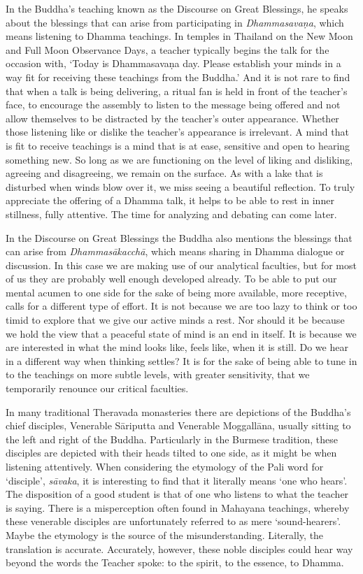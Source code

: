In the Buddha’s teaching known as the Discourse on Great
Blessings,\cite{mahamangala-sutta}
he speaks about the blessings that can arise from participating in
\emph{Dhammasavaṇa}, which means listening to Dhamma teachings. In temples in
Thailand on the New Moon and Full Moon Observance Days, a teacher
typically begins the talk for the occasion with, ‘Today is Dhammasavaṇa
day. Please establish your minds in a way fit for receiving these
teachings from the Buddha.’ And it is not rare to find that when a talk
is being delivering, a ritual fan is held in front of the teacher’s
face, to encourage the assembly to listen to the message being offered
and not allow themselves to be distracted by the teacher’s outer
appearance. Whether those listening like or dislike the teacher’s
appearance is irrelevant. A mind that is fit to receive teachings is a
mind that is at ease, sensitive and open to hearing something new. So
long as we are functioning on the level of liking and disliking,
agreeing and disagreeing, we remain on the surface. As with a lake that
is disturbed when winds blow over it, we miss seeing a beautiful
reflection. To truly appreciate the offering of a Dhamma talk, it helps
to be able to rest in inner stillness, fully attentive. The time for
analyzing and debating can come later.

In the Discourse on Great Blessings the Buddha also mentions the
blessings that can arise from \emph{Dhammasākacchā}, which means sharing in
Dhamma dialogue or discussion. In this case we are making use of our
analytical faculties, but for most of us they are probably well enough
developed already. To be able to put our mental acumen to one side for
the sake of being more available, more receptive, calls for a different
type of effort. It is not because we are too lazy to think or too timid
to explore that we give our active minds a rest. Nor should it be
because we hold the view that a peaceful state of mind is an end in
itself. It is because we are interested in what the mind looks like,
feels like, when it is still. Do we hear in a different way when
thinking settles? It is for the sake of being able to tune in to the
teachings on more subtle levels, with greater sensitivity, that we
temporarily renounce our critical faculties.

In many traditional Theravada monasteries there are depictions of the
Buddha’s chief disciples, Venerable Sāriputta and Venerable Moggallāna,
usually sitting to the left and right of the Buddha. Particularly in the
Burmese tradition, these disciples are depicted with their heads tilted
to one side, as it might be when listening attentively. When considering
the etymology of the Pali word for ‘disciple’, \emph{sāvaka}, it is
interesting to find that it literally means ‘one who hears’. The
disposition of a good student is that of one who listens to what the
teacher is saying. There is a misperception often found in Mahayana
teachings, whereby these venerable disciples are unfortunately referred
to as mere ‘sound-hearers’. Maybe the etymology is the source of the
misunderstanding. Literally, the translation is accurate. Accurately,
however, these noble disciples could hear way beyond the words the
Teacher spoke: to the spirit, to the essence, to Dhamma.

